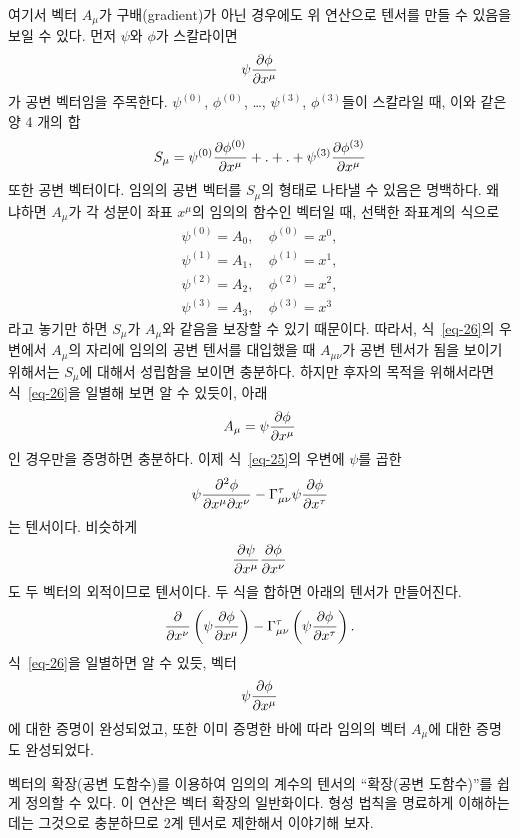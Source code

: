 여기서 벡터 $A_\mu$가 구배(gradient)가 아닌 경우에도 위 연산으로 텐서를 만들 수 있음을 보일 수 있다. 먼저 $\psi$와 $\phi$가 스칼라이면 
\[\psi{\frac{{\partial}{\phi}}{{\partial}{x^\mu}}}\]
가 공변 벡터임을 주목한다. $\psi^{(0)}$, $\phi^{(0)}$, \dots, $\psi^{(3)}$, $\phi^{(3)}$들이 스칼라일 때, 이와 같은 양 4 개의 합
\[S_\mu=\psi^{(0)}{\frac{{\partial}{\phi^{(0)}}}{{\partial}{x^\mu}}} 
+ . 
+ . 
+\psi^{(3)}{\frac{{\partial}{\phi^{(3)}}}{{\partial}{x^\mu}}} \]
또한 공변 벡터이다. 임의의 공변 벡터를 $S_\mu$의 형태로 나타낼 수 있음은 명백하다. 왜냐하면 $A_\mu$가 각 성분이 좌표 $x^\mu$의 임의의 함수인 벡터일 때, 선택한 좌표계의 식으로
\begin{align*}
	\psi^{(0)}=A_0,~ & \phi^{(0)}=x^0, \\
	\psi^{(1)}=A_1,~ & \phi^{(1)}=x^1, \\
	\psi^{(2)}=A_2,~ & \phi^{(2)}=x^2, \\
	\psi^{(3)}=A_3,~ & \phi^{(3)}=x^3
\end{align*}
라고 놓기만 하면 $S_\mu$가 $A_\mu$와 같음을 보장할 수 있기 때문이다.
따라서, 식~\eqref{eq-26}의 우변에서 $A_\mu$의 자리에 임의의 공변 텐서를 대입했을 때 $A_{\mu\nu}$가 공변 텐서가 됨을 보이기 위해서는 $ S_\mu $에 대해서 성립함을 보이면 충분하다. 하지만 후자의 목적을 위해서라면 식~\eqref{eq-26}을 일별해 보면 알 수 있듯이, 아래
\begin{equation*}
	A_\mu=\psi{\frac{{\partial}{\phi}}{{\partial}{x^\mu}}}
\end{equation*}
인 경우만을 증명하면 충분하다.
이제 식~\eqref{eq-25}의 우변에 $\psi$를 곱한
\begin{equation*}
	\psi{\frac{{\partial^2}{\phi}}{{\partial}{x^\mu}{\partial}{x^\nu}}}  
	- \Gamma_{\mu\nu}^\tau \psi{\frac{{\partial}{\phi}}{{\partial}{x^\tau}}}
\end{equation*} 
는 텐서이다. 비슷하게
\[{\frac{{\partial}{\psi}}{{\partial}{x^\mu}}}{\frac{{\partial}{\phi}}{{\partial}{x^\nu}}}\]
도 두 벡터의 외적이므로 텐서이다. 두 식을 합하면 아래의 텐서가 만들어진다.
\begin{equation*}
	{\frac{{\partial}{}}{{\partial}{x^\nu}}}\left(\psi{\frac{{\partial}{\phi}}{{\partial}{x^\mu}}}\right)
	- \Gamma_{\mu\nu}^{\tau}\left(\psi{\frac{{\partial}{\phi}}{{\partial}{x^\tau}}}\right).
\end{equation*}
식~\eqref{eq-26}을 일별하면 알 수 있듯, 벡터 \[\psi{\frac{{\partial}{\phi}}{{\partial}{x^\mu}}} \]에 대한 증명이 완성되었고, 또한 이미 증명한 바에 따라 임의의 벡터 $A_\mu$에 대한 증명도 완성되었다.

벡터의 확장(공변 도함수)를 이용하여 임의의 계수의 텐서의 ``확장(공변 도함수)''를 쉽게 정의할 수 있다. 이 연산은 벡터 확장의 일반화이다.  형성 법칙을 명료하게 이해하는 데는 그것으로 충분하므로 2계 텐서로 제한해서 이야기해 보자.

